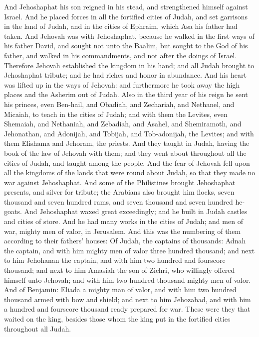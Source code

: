 And Jehoshaphat his son reigned in his stead, and strengthened himself against Israel. And he placed forces in all the fortified cities of Judah, and set garrisons in the land of Judah, and in the cities of Ephraim, which Asa his father had taken. And Jehovah was with Jehoshaphat, because he walked in the first ways of his father David, and sought not unto the Baalim, but sought to the God of his father, and walked in his commandments, and not after the doings of Israel. Therefore Jehovah established the kingdom in his hand; and all Judah brought to Jehoshaphat tribute; and he had riches and honor in abundance. And his heart was lifted up in the ways of Jehovah: and furthermore he took away the high places and the Asherim out of Judah.  Also in the third year of his reign he sent his princes, even Ben-hail, and Obadiah, and Zechariah, and Nethanel, and Micaiah, to teach in the cities of Judah; and with them the Levites, even Shemaiah, and Nethaniah, and Zebadiah, and Asahel, and Shemiramoth, and Jehonathan, and Adonijah, and Tobijah, and Tob-adonijah, the Levites; and with them Elishama and Jehoram, the priests. And they taught in Judah, having the book of the law of Jehovah with them; and they went about throughout all the cities of Judah, and taught among the people.  And the fear of Jehovah fell upon all the kingdoms of the lands that were round about Judah, so that they made no war against Jehoshaphat. And some of the Philistines brought Jehoshaphat presents, and silver for tribute; the Arabians also brought him flocks, seven thousand and seven hundred rams, and seven thousand and seven hundred he-goats. And Jehoshaphat waxed great exceedingly; and he built in Judah castles and cities of store. And he had many works in the cities of Judah; and men of war, mighty men of valor, in Jerusalem. And this was the numbering of them according to their fathers’ houses: Of Judah, the captains of thousands: Adnah the captain, and with him mighty men of valor three hundred thousand; and next to him Jehohanan the captain, and with him two hundred and fourscore thousand; and next to him Amasiah the son of Zichri, who willingly offered himself unto Jehovah; and with him two hundred thousand mighty men of valor. And of Benjamin: Eliada a mighty man of valor, and with him two hundred thousand armed with bow and shield; and next to him Jehozabad, and with him a hundred and fourscore thousand ready prepared for war. These were they that waited on the king, besides those whom the king put in the fortified cities throughout all Judah. 

